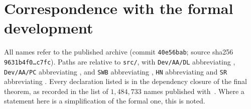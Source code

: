 \documentclass[11pt]{amsart}
\theoremstyle{plain}
\theoremstyle{definition}
\numberwithin{equation}{section}
\begin{document}
\section{Correspondence with the formal development}\label{app:lean}

All names refer to the published archive (commit \texttt{40e56bab}; source sha256
\texttt{9631b4f0\ldots c7fc}). Paths are relative to \texttt{src/}, with
\texttt{Dev/AA/DL} abbreviating ,
\texttt{Dev/AA/PC} abbreviating , and
\texttt{SWB} abbreviating , \texttt{HN} abbreviating
 and \texttt{SR} abbreviating . Every declaration listed is in the
dependency closure of the final theorem, as recorded in the list of $1{,}484{,}733$ names published
with~\cite{dixit-repo}. Where a statement here is a simplification of the formal one, this is noted.
\end{document}
